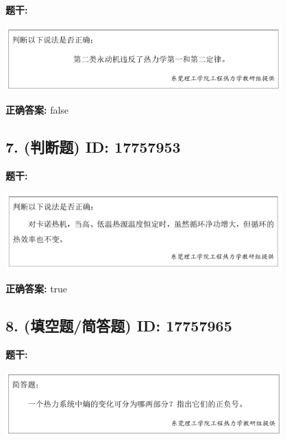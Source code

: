 \documentclass[12pt]{article}
\begin{document}
\textbf{题干:}


\begin{center}\includegraphics[width=0.8\textwidth, height=0.25\textheight, keepaspectratio]{question_6_17757952/title_img_1.png}\end{center}

\textbf{正确答案:}
false

\vspace{0.5em}\hrulefill\vspace{1em}

\subsection*{7. (判断题) \small ID: 17757953}

\textbf{题干:}


\begin{center}\includegraphics[width=0.8\textwidth, height=0.25\textheight, keepaspectratio]{question_7_17757953/title_img_1.png}\end{center}

\textbf{正确答案:}
true

\vspace{0.5em}\hrulefill\vspace{1em}

\subsection*{8. (填空题/简答题) \small ID: 17757965}

\textbf{题干:}


\begin{center}\includegraphics[width=0.8\textwidth, height=0.25\textheight, keepaspectratio]{question_8_17757965/title_img_1.png}\end{center}
\end{document}
